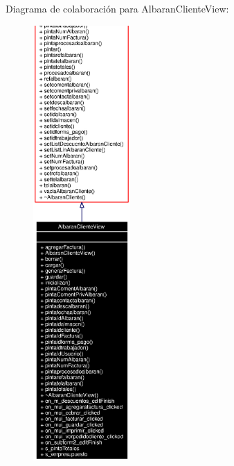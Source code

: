 Diagrama de colaboraci\'{o}n para Albaran\-Cliente\-View:\begin{figure}[H]
\begin{center}
\leavevmode
\includegraphics[width=105pt]{classAlbaranClienteView__coll__graph}
\end{center}
\end{figure}

